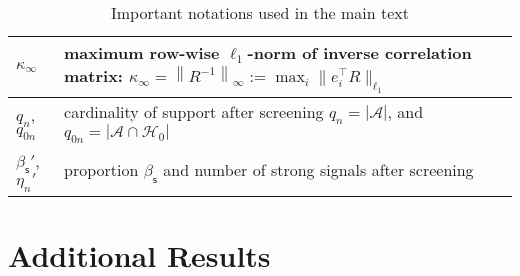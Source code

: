 \documentclass[12pt]{article}
\newcommand{\abs}[1]{\left\lvert#1\right\rvert}
\newcommand{\norm}[1]{\left\lVert#1\right\rVert}
\newcommand{\cA}{\mathcal{A}}
\newcommand{\cH}{\mathcal{H}}
\newcommand{\cP}{\mathcal{P}}
\def\calH{{\mathcal H}}
\theoremstyle{plain}
\begin{document}
\begin{table}[htbp]
\begin{tabular}{|l|l|}
    \hline
    $\kappa_\infty$ & maximum row-wise $\ell_1$-norm of inverse correlation matrix: $\kappa_\infty=\norm{R^{-1}}_\infty:=\max_{i}\|e_i^{\top}R\|_{\ell_1}$ \\
    \hline
    $q_n$, $q_{0n}$ & cardinality of support after screening $q_n=\abs{\cA}$, and  $q_{0n}=\abs{\cA\cap \cH_0 }$ \\
    \hline
    $\beta_{\mathsf{s} }'$,  $\eta_n'$&  proportion $\beta_{\mathsf{s} }$ and number of strong signals after screening\\
    
     
  \hline \hline
	\end{tabular}
	\caption{Important notations used in the main text
 }
	\label{tab:tab-notations}
\end{table}

\section{Additional Results}
\end{document}
